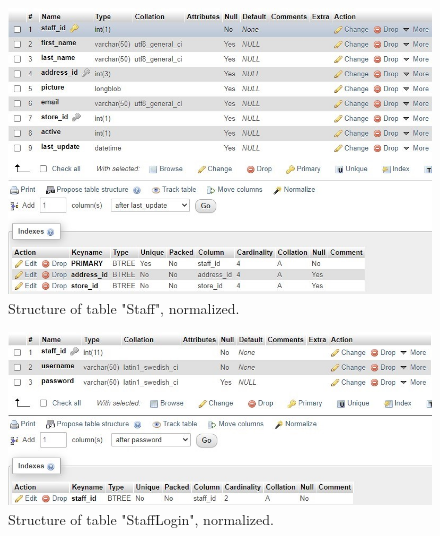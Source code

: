 \documentclass{article}
\begin{document}
		\begin{figure}[H]
			\includegraphics[width=\textwidth]{table_staff_nstruct}
			\caption{Structure of table "Staff", normalized.}
		\end{figure}
		\begin{figure}[H]
			\includegraphics[width=\textwidth]{table_stafflogin_nstruct}
			\caption{Structure of table "Staff\textunderscore Login", normalized.}
		\end{figure}
	
\end{document}
